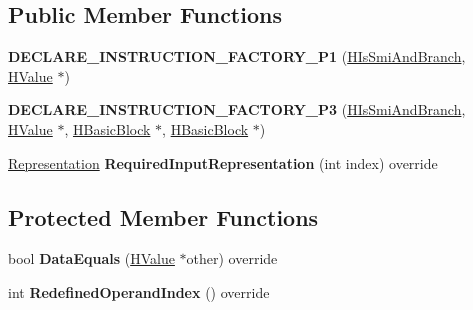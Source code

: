 \subsection*{Public Member Functions}
\begin{DoxyCompactItemize}
\item 
{\bfseries D\+E\+C\+L\+A\+R\+E\+\_\+\+I\+N\+S\+T\+R\+U\+C\+T\+I\+O\+N\+\_\+\+F\+A\+C\+T\+O\+R\+Y\+\_\+\+P1} (\hyperlink{classv8_1_1internal_1_1_h_is_smi_and_branch}{H\+Is\+Smi\+And\+Branch}, \hyperlink{classv8_1_1internal_1_1_h_value}{H\+Value} $\ast$)\hypertarget{classv8_1_1internal_1_1_h_is_smi_and_branch_a68605832ef3c5186b402e2a47092ad5d}{}\label{classv8_1_1internal_1_1_h_is_smi_and_branch_a68605832ef3c5186b402e2a47092ad5d}

\item 
{\bfseries D\+E\+C\+L\+A\+R\+E\+\_\+\+I\+N\+S\+T\+R\+U\+C\+T\+I\+O\+N\+\_\+\+F\+A\+C\+T\+O\+R\+Y\+\_\+\+P3} (\hyperlink{classv8_1_1internal_1_1_h_is_smi_and_branch}{H\+Is\+Smi\+And\+Branch}, \hyperlink{classv8_1_1internal_1_1_h_value}{H\+Value} $\ast$, \hyperlink{classv8_1_1internal_1_1_h_basic_block}{H\+Basic\+Block} $\ast$, \hyperlink{classv8_1_1internal_1_1_h_basic_block}{H\+Basic\+Block} $\ast$)\hypertarget{classv8_1_1internal_1_1_h_is_smi_and_branch_a4df6ed35e816b343b049aab9c1873de2}{}\label{classv8_1_1internal_1_1_h_is_smi_and_branch_a4df6ed35e816b343b049aab9c1873de2}

\item 
\hyperlink{classv8_1_1internal_1_1_representation}{Representation} {\bfseries Required\+Input\+Representation} (int index) override\hypertarget{classv8_1_1internal_1_1_h_is_smi_and_branch_a7387a7fb10a2b353abfa29614b54a0d5}{}\label{classv8_1_1internal_1_1_h_is_smi_and_branch_a7387a7fb10a2b353abfa29614b54a0d5}

\end{DoxyCompactItemize}
\subsection*{Protected Member Functions}
\begin{DoxyCompactItemize}
\item 
bool {\bfseries Data\+Equals} (\hyperlink{classv8_1_1internal_1_1_h_value}{H\+Value} $\ast$other) override\hypertarget{classv8_1_1internal_1_1_h_is_smi_and_branch_a88dbc29168153e351710d1acac2da792}{}\label{classv8_1_1internal_1_1_h_is_smi_and_branch_a88dbc29168153e351710d1acac2da792}

\item 
int {\bfseries Redefined\+Operand\+Index} () override\hypertarget{classv8_1_1internal_1_1_h_is_smi_and_branch_adb690695b601bc66bc49c17e4921fd9f}{}\label{classv8_1_1internal_1_1_h_is_smi_and_branch_adb690695b601bc66bc49c17e4921fd9f}

\end{DoxyCompactItemize}
